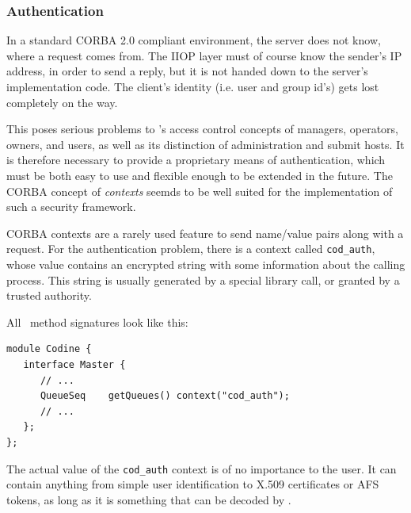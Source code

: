 \subsubsection{\label{s_user_authentication}Authentication}
In a standard CORBA 2.0 compliant environment, the server does not know,
where a request comes from. The IIOP layer must of course know the sender's
IP address, in order to send a reply, but it is not handed down to the
server's implementation code. The client's identity (i.e. user and group id's)
gets lost completely on the way.

This poses serious problems to \codine's access control concepts of managers,
operators, owners, and users, as well as its distinction of administration and 
submit hosts. It is
therefore necessary to provide a proprietary means of authentication, which
must be both easy to use and flexible enough to be extended in the future.
The CORBA concept of \textsl{contexts} seemds to be well suited for the
implementation of such a security framework.

CORBA contexts are a rarely used feature to send name/value pairs along with
a request. For the authentication problem, there is a context called
\texttt{cod\_auth}, whose value contains an encrypted string with some
information about the calling process. This string is usually generated by a
special library call, or granted by a trusted authority. 

All \qidl\ method signatures look like this:
\begin{Verbatim}[fontsize=\small, frame=single]
module Codine {
   interface Master {
      // ...
      QueueSeq    getQueues() context("cod_auth");
      // ...
   };
};
\end{Verbatim}
The actual value of the \texttt{cod\_auth} context is of no importance to
the user. It can contain anything from simple user identification to X.509
certificates or AFS tokens, as long as it is something that can be
decoded by \codine.

